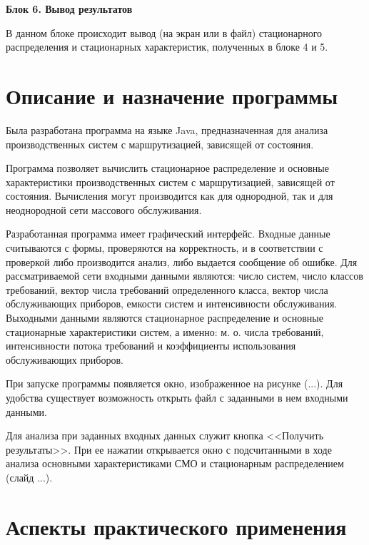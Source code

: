 \documentclass[a4paper,14pt]{extarticle}
\theoremstyle{note}
\begin{document}
\medskip
\textbf{Блок 6. Вывод результатов}

В данном блоке происходит вывод (на экран или в файл) стационарного распределения и стационарных характеристик, полученных в блоке 4 и 5.




\section{Описание и назначение программы}
\label{sec:program_description_and_purpose}

Была разработана программа на языке Java, предназначенная для анализа производственных систем с маршрутизацией, зависящей от состояния.

Программа позволяет вычислить стационарное распределение и основные характеристики производственных систем с маршрутизацией, зависящей от состояния. Вычисления могут производится как для однородной, так и для неоднородной сети массового обслуживания.

Разработанная программа имеет графический интерфейс. Входные данные считываются с формы, проверяются на корректность, и в соответствии с проверкой либо производится анализ, либо выдается сообщение об ошибке. Для рассматриваемой сети входными данными являются: число систем, число классов требований, вектор числа требований определенного класса, вектор числа обслуживающих приборов, емкости систем и интенсивности обслуживания. Выходными данными являются стационарное распределение и основные стационарные характеристики систем, а именно: м. о. числа требований, интенсивности потока требований и коэффициенты использования обслуживающих приборов.

При запуске программы появляется окно, изображенное на рисунке (...). Для удобства существует возможность открыть файл с заданными в нем входными данными.

Для анализа при заданных входных данных служит кнопка <<Получить результаты>>. При ее нажатии открывается окно с подсчитанными в ходе анализа основными характеристиками СМО и стационарным распределением (слайд ...).




\section{Аспекты практического применения}
\label{sec:practical_application}
\end{document}
